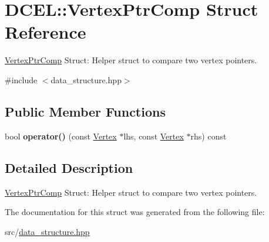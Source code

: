 \hypertarget{structDCEL_1_1VertexPtrComp}{}\section{D\+C\+EL\+:\+:Vertex\+Ptr\+Comp Struct Reference}
\label{structDCEL_1_1VertexPtrComp}


\hyperlink{structDCEL_1_1VertexPtrComp}{Vertex\+Ptr\+Comp} Struct\+: Helper struct to compare two vertex pointers.  




{\ttfamily \#include $<$data\+\_\+structure.\+hpp$>$}

\subsection*{Public Member Functions}
\begin{DoxyCompactItemize}
\item 
\mbox{\label{structDCEL_1_1VertexPtrComp_a6058135de8dda7cf6a998939e21c415e}} 
bool {\bfseries operator()} (const \hyperlink{structVertex}{Vertex} $\ast$lhs, const \hyperlink{structVertex}{Vertex} $\ast$rhs) const
\end{DoxyCompactItemize}


\subsection{Detailed Description}
\hyperlink{structDCEL_1_1VertexPtrComp}{Vertex\+Ptr\+Comp} Struct\+: Helper struct to compare two vertex pointers. 

The documentation for this struct was generated from the following file\+:\begin{DoxyCompactItemize}
\item 
src/\hyperlink{data__structure_8hpp}{data\+\_\+structure.\+hpp}\end{DoxyCompactItemize}
